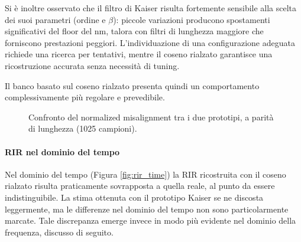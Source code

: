 \documentclass[11pt,a4paper]{article}
\begin{document}
	Si è inoltre osservato che il filtro di Kaiser risulta fortemente sensibile alla scelta dei suoi parametri (ordine e $\beta$): piccole variazioni producono spostamenti significativi del floor del \ac{nm}, talora con filtri di lunghezza maggiore che forniscono prestazioni peggiori.
	L'individuazione di una configurazione adeguata richiede una ricerca per tentativi, mentre il coseno rialzato garantisce una ricostruzione accurata senza necessità di tuning.
	
	Il banco basato sul coseno rialzato presenta quindi un comportamento complessivamente più regolare e prevedibile. 
	
	\begin{figure}[H]
		\centering
		\caption{Confronto del normalized misalignment tra i due prototipi, a parità di lunghezza (1025 campioni).}
		\label{fig:nm_prot}
	\end{figure}
	
	\paragraph{RIR nel dominio del tempo}
	Nel dominio del tempo (Figura \ref{fig:rir_time}) la RIR ricostruita con il coseno rialzato risulta praticamente sovrapposta a quella reale, al punto da essere indistinguibile.
	La stima ottenuta con il prototipo Kaiser se ne discosta leggermente, ma le differenze nel dominio del tempo non sono particolarmente marcate.
	Tale discrepanza emerge invece in modo più evidente nel dominio della frequenza, discusso di seguito.
	
\end{document}
